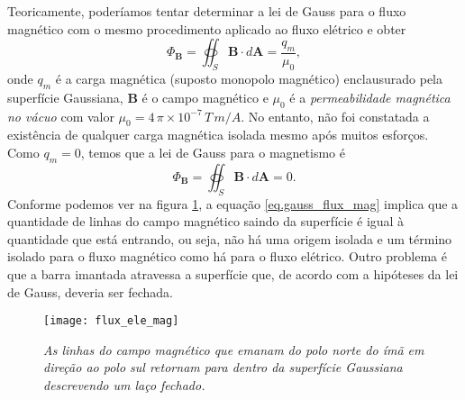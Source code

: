 Teoricamente, poderíamos tentar determinar a lei de Gauss para o fluxo magnético com o mesmo procedimento aplicado ao fluxo elétrico e obter
\begin{equation*}
\Phi_\textbf{B}=\oiint_S\textbf{B}\cdot\textit{d}\textbf{A}=\frac{q_m}{\mu_0},
\end{equation*} 
onde $q_m$ é a carga magnética (suposto monopolo magnético) enclausurado pela superfície Gaussiana, $\mathbf{B}$ é o campo magnético e $\mu_0$ é a \textit{permeabilidade magnética no vácuo} com valor $\mu_0=4\,\pi\times 10^{-7}\, T\,m/A$. No entanto, não foi constatada a existência de qualquer carga magnética isolada mesmo após muitos esforços. Como $q_m=0$, temos que a lei de Gauss para o magnetismo é
\begin{equation}\label{eq.gauss_flux_mag}
\Phi_\textbf{B}=\oiint_S\textbf{B}\cdot\textit{d}\textbf{A}=0.
\end{equation}
Conforme podemos ver na figura \ref{fig.flux_elet_magn}, a equação \ref{eq.gauss_flux_mag} implica que a quantidade de linhas do campo magnético saindo da superfície é igual à quantidade que está entrando, ou seja, não há uma origem isolada e um término isolado para o fluxo magnético como há para o fluxo elétrico. Outro problema é que a barra imantada atravessa a superfície que, de acordo com a hipóteses da lei de Gauss, deveria ser fechada.
\begin{figure}[!htb]
\centering
\texttt{[image: flux\_ele\_mag]}
\caption{\textit{As linhas do campo magnético que emanam do polo norte do ímã em direção ao polo sul retornam para dentro da superfície Gaussiana descrevendo um laço fechado.}}
\label{fig.flux_elet_magn}
\end{figure}

